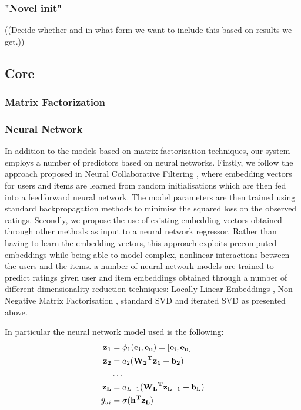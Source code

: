\documentclass[10pt,conference,compsocconf]{IEEEtran}
\begin{document}
\subsubsection{"Novel init"}
((Decide whether and in what form we want to include this based on results we get.))

\subsection{Core}
\subsubsection{Matrix Factorization}
\subsubsection{Neural Network}
In addition to the models based on matrix factorization techniques, our system employs a number of predictors based on neural networks. Firstly, we follow the approach proposed in Neural Collaborative Filtering \cite{he2017neural}, where embedding vectors for users and items are learned from random initialisations which are then fed into a feedforward neural network. The model parameters are then trained using standard backpropagation methods to minimise the squared loss on the observed ratings. 
Secondly, we propose the use of existing embedding vectors obtained through other methods as input to a neural network regressor. Rather than having to learn the embedding vectors, this approach exploits precomputed embeddings while being able to model complex, nonlinear interactions  between the users and the items. 
a number of neural network models are trained to predict ratings given user and item embeddings obtained through a number of different dimensionality reduction techniques: Locally Linear Embeddings \cite{roweis2000nonlinear}, Non-Negative Matrix Factorisation \cite{cichocki2009fast}, standard SVD and iterated SVD as presented above.

In particular the neural network model used is the following:
\begin{equation}
\begin{aligned}
    \bf{z_1} &= \phi_1(\bf{e_i}, \bf{e_u}) = [\bf{e_i}, \bf{e_u}]\\
    \bf{z_2} &= a_2(\bf{W_2}^T \bf{z_1} + b_2) \\
    &\dots \\
    \bf{z_L} &= a_{L - 1 }(\bf{W_{L}}^T \bf{z_{L - 1}} + b_L) \\
    \hat y_{ui} &= \sigma(\bf{h}^T \bf{z_L})
\end{aligned}
\end{equation}
\end{document}
